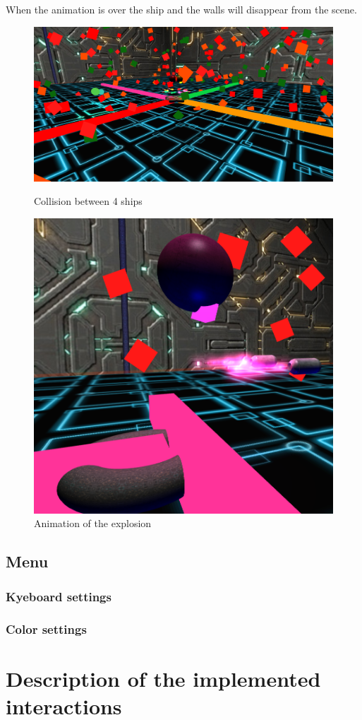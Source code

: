 \documentclass[11pt]{article}
\begin{document}
When the animation is over the ship and the walls will disappear from the scene.

\begin{figure}
	\centering
	\begin{minipage}[b]{0.8\linewidth}
		\includegraphics[width=\linewidth]{collision}
		\caption{Collision between 4 ships}
	\end{minipage}
	\hfill
	\begin{minipage}[b]{0.4\linewidth}
		\includegraphics[width=\linewidth]{explosion}
		\caption{Animation of the explosion}
	\end{minipage}
\end{figure}
\FloatBarrier
\subsection{Menu}

\subsubsection{Kyeboard settings}

\subsubsection{Color settings}

\section{Description of the implemented interactions}
\end{document}
